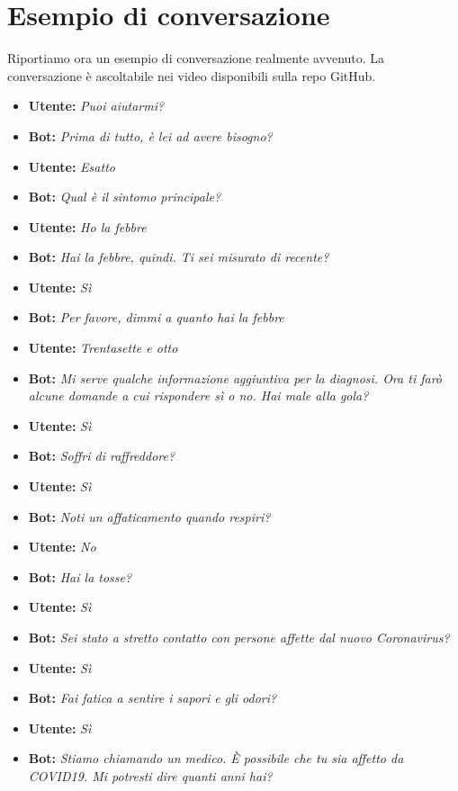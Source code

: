 \section{Esempio di conversazione}
Riportiamo ora un esempio di conversazione realmente avvenuto. La conversazione è ascoltabile nei video disponibili sulla repo GitHub\cite{media:videos}.
\begin{itemize}
  \item \textbf{Utente:} \textit{Puoi aiutarmi?}
  \item \textbf{Bot:} \textit{Prima di tutto, è lei ad avere bisogno?}
  \item \textbf{Utente:} \textit{Esatto}
  \item \textbf{Bot:} \textit{Qual è il sintomo principale?}
  \item \textbf{Utente:} \textit{Ho la febbre}
  \item \textbf{Bot:} \textit{Hai la febbre, quindi. Ti sei misurato di recente?}
  \item \textbf{Utente:} \textit{Sì}
  \item \textbf{Bot:} \textit{Per favore, dimmi a quanto hai la febbre}
  \item \textbf{Utente:} \textit{Trentasette e otto}
  \item \textbf{Bot:} \textit{Mi serve qualche informazione aggiuntiva per la diagnosi. Ora ti farò alcune domande a cui rispondere sì o no. Hai male alla gola?}
  \item \textbf{Utente:} \textit{Sì}
  \item \textbf{Bot:} \textit{Soffri di raffreddore?}
  \item \textbf{Utente:} \textit{Sì}
  \item \textbf{Bot:} \textit{Noti un affaticamento quando respiri?}
  \item \textbf{Utente:} \textit{No}
  \item \textbf{Bot:} \textit{Hai la tosse?}
  \item \textbf{Utente:} \textit{Sì}
  \item \textbf{Bot:} \textit{Sei stato a stretto contatto con persone affette dal nuovo Coronavirus?}
  \item \textbf{Utente:} \textit{Sì}
  \item \textbf{Bot:} \textit{Fai fatica a sentire i sapori e gli odori?}
  \item \textbf{Utente:} \textit{Sì}
  \item \textbf{Bot:} \textit{Stiamo chiamando un medico. È possibile che tu sia affetto da COVID19. Mi potresti dire quanti anni hai?}

\end{itemize}
